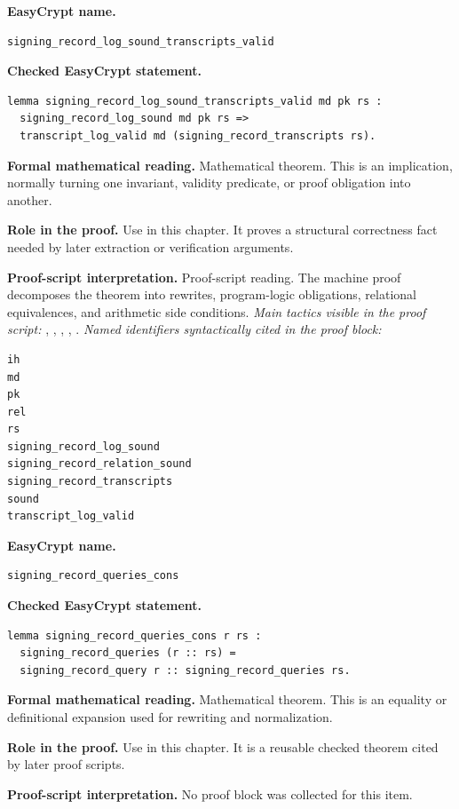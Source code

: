 \begin{formaltheorem}
\noindent\textbf{EasyCrypt name.}
\begin{lstlisting}[language=EasyCrypt,basicstyle=\ttfamily\scriptsize]
signing_record_log_sound_transcripts_valid
\end{lstlisting}
\noindent\textbf{Checked EasyCrypt statement.}
\begin{lstlisting}[language=EasyCrypt,basicstyle=\ttfamily\scriptsize]
lemma signing_record_log_sound_transcripts_valid md pk rs :
  signing_record_log_sound md pk rs =>
  transcript_log_valid md (signing_record_transcripts rs).
\end{lstlisting}
\noindent\textbf{Formal mathematical reading.}
Mathematical theorem. This is an implication, normally turning one invariant, validity predicate, or proof obligation into another.

\noindent\textbf{Role in the proof.}
Use in this chapter. It proves a structural correctness fact needed by later extraction or verification arguments.

\noindent\textbf{Proof-script interpretation.}
Proof-script reading. The machine proof decomposes the theorem into rewrites, program-logic obligations, relational equivalences, and arithmetic side conditions.
\emph{Main tactics visible in the proof script:} , , , , .
\emph{Named identifiers syntactically cited in the proof block:}
\begin{lstlisting}[language=EasyCrypt,basicstyle=\ttfamily\scriptsize]
ih
md
pk
rel
rs
signing_record_log_sound
signing_record_relation_sound
signing_record_transcripts
sound
transcript_log_valid
\end{lstlisting}

\end{formaltheorem}

\begin{formaltheorem}
\noindent\textbf{EasyCrypt name.}
\begin{lstlisting}[language=EasyCrypt,basicstyle=\ttfamily\scriptsize]
signing_record_queries_cons
\end{lstlisting}
\noindent\textbf{Checked EasyCrypt statement.}
\begin{lstlisting}[language=EasyCrypt,basicstyle=\ttfamily\scriptsize]
lemma signing_record_queries_cons r rs :
  signing_record_queries (r :: rs) =
  signing_record_query r :: signing_record_queries rs.
\end{lstlisting}
\noindent\textbf{Formal mathematical reading.}
Mathematical theorem. This is an equality or definitional expansion used for rewriting and normalization.

\noindent\textbf{Role in the proof.}
Use in this chapter. It is a reusable checked theorem cited by later proof scripts.

\noindent\textbf{Proof-script interpretation.}
No proof block was collected for this item.

\end{formaltheorem}

